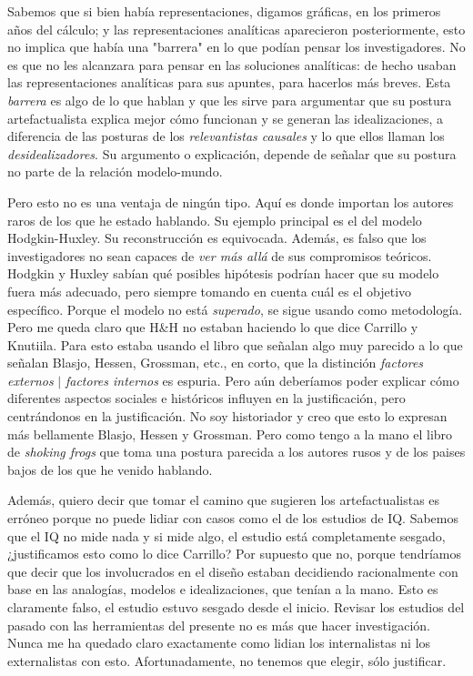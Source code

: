 Sabemos que si bien había representaciones, digamos gráficas, en los primeros años del cálculo; y las representaciones analíticas aparecieron posteriormente, esto no implica que había una "barrera" en lo que podían pensar los investigadores.
No es que no les alcanzara para pensar en las soluciones analíticas: de hecho usaban las representaciones analíticas para sus apuntes, para hacerlos más breves.
Esta \emph{barrera} es algo de lo que hablan \textcite{Carrillo2021-CARAAP-12}  y que les sirve para argumentar que su postura artefactualista explica mejor cómo funcionan y se generan las idealizaciones, a diferencia de las posturas de los \emph{relevantistas causales} y lo que ellos llaman los \emph{desidealizadores}.
Su argumento o explicación, depende de señalar que su postura no parte de la relación modelo-mundo.

Pero esto no es una ventaja de ningún tipo.
Aquí es donde importan los autores raros de los que he estado hablando.
Su ejemplo principal es el del modelo Hodgkin-Huxley.
Su reconstrucción es equivocada.
Además, es falso que los investigadores no sean capaces de \emph{ver más allá} de sus compromisos teóricos.
Hodgkin y Huxley sabían qué posibles hipótesis podrían hacer que su modelo fuera más adecuado, pero siempre tomando en cuenta cuál es el objetivo específico.
Porque el modelo no está \emph{superado}, se sigue usando como metodología.
Pero me queda claro que H\&H no estaban haciendo lo que dice Carrillo y Knutiila.
Para esto estaba usando el libro  que señalan algo muy parecido a lo que señalan Blasjo, Hessen, Grossman, etc., en corto, que la distinción \emph{factores externos} $|$ \emph{factores internos} es espuria.
Pero aún deberíamos poder explicar cómo diferentes aspectos sociales e históricos influyen en la justificación, pero centrándonos en la justificación.
No soy historiador y creo que esto lo expresan más bellamente Blasjo, Hessen y Grossman.
Pero como tengo a la mano el libro de \emph{shoking frogs} que toma una postura parecida a los autores rusos y de los paises bajos de los que he venido hablando.

Además, quiero decir que tomar el camino que sugieren los artefactualistas es erróneo porque no puede lidiar con casos como el de los estudios de IQ.
Sabemos que el IQ no mide nada y si mide algo, el estudio está completamente sesgado, ¿justificamos esto como lo dice Carrillo?
Por supuesto que no, porque tendríamos que decir que los involucrados en el diseño estaban decidiendo racionalmente con base en las analogías, modelos e idealizaciones, que tenían a la mano.
Esto es claramente falso, el estudio estuvo sesgado desde el inicio.
Revisar los estudios del pasado con las herramientas del presente no es más que hacer investigación.
Nunca me ha quedado claro exactamente como lidian los internalistas ni los externalistas con esto.
Afortunadamente, no tenemos que elegir, sólo justificar.

